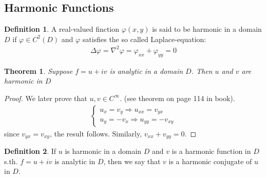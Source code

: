 \documentclass[12pt, a4paper]{article}
\theoremstyle{plain}
\newtheorem{thm}{Theorem} %
\theoremstyle{definition}
\newtheorem{definition}{Definition} %
\begin{document}
		\subsection{Harmonic Functions} %
		\label{sub:harmonic_functions}
			\begin{definition}
				A real-valued finction $\varphi(x,y)$ is said to be harmonic in a domain $D$ if $\varphi\in C^2(D)$ and $\varphi$ satisfies the so called Laplace-equation:
				\begin{align*}
					\Delta \varphi = \nabla^2 \varphi = \varphi_{xx} + \varphi_{yy} = 0\tag*{in $D$}
				\end{align*}
			\end{definition}

			\begin{thm}
				Suppose $f=u+iv$ is analytic in a domain $D$. Then $u$ and $v$ are harmonic in $D$
			\end{thm}

			\begin{proof}
				We later prove that $u,v\in C^\infty$. (see theorem on page 114 in book).
				\begin{align*}
					\begin{cases}
						u_x = v_y \Rightarrow u_{xx} =v_{yx}\\
						u_y = -v_x \Rightarrow u_{yy} = -v_{xy}
					\end{cases}
				\end{align*}
				since $v_{yx} = v_{xy}$, the result follows. Similarly, $v_{xx} + v_{yy} = 0$.
			\end{proof}

			\begin{definition}
				If $u$ is harmonic in a domain $D$ and $v$ is a harmonic function in $D$ s.th. $f=u+iv$ is analytic in $D$, then we say that $v$ is a harmonic conjugate of $u$ in $D$.\\
			\end{definition}
\end{document}
